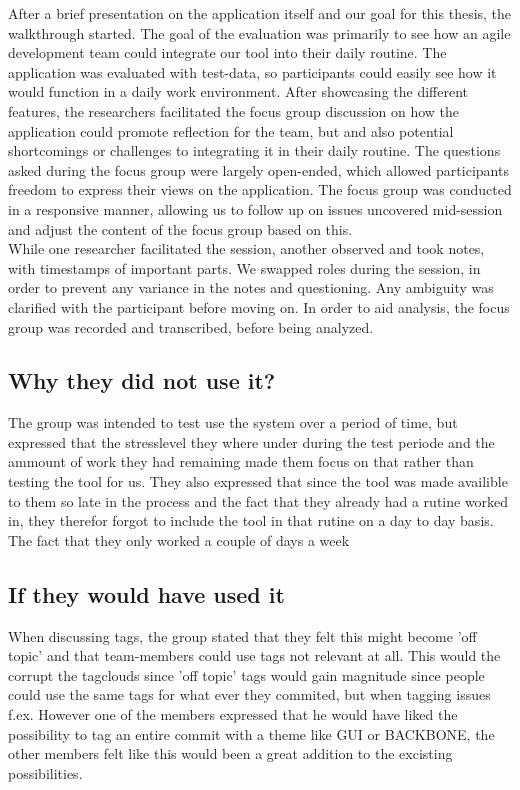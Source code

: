 After a brief presentation on the application itself and our goal for this thesis, the walkthrough started. The goal of the evaluation was primarily to see how an agile development team could integrate our tool into their daily routine. The application was evaluated with test-data, so participants could easily see how it would function in a daily work environment. After showcasing the different features, the researchers facilitated the focus group discussion on how the application could promote reflection for the team, but and also potential shortcomings or challenges to integrating it in their daily routine. The questions asked during the focus group were largely open-ended, which allowed participants freedom to express their views on the application\cite{yin2008case}. The focus group was conducted in a responsive manner, allowing us to follow up on issues uncovered mid-session and adjust the content of the focus group based on this\cite{rubin2011qualitative, wengraf2001qualitative}.\\
While one researcher facilitated the session, another observed and took notes, with timestamps of important parts. We swapped roles during the session, in order to prevent any variance in the notes and questioning. Any ambiguity was clarified with the participant before moving on. In order to aid analysis, the focus group was recorded and transcribed, before being analyzed. 

\subsection{Why they did not use it?}
The group was intended to test use the system over a period of time, but expressed that the stresslevel they where under during the test periode and the ammount of work they had remaining made them focus on that rather than testing the tool for us. They also expressed that since the tool was made availible to them so late in the process and the fact that they already had a rutine worked in, they therefor forgot to include the tool in that rutine on a day to day basis. The fact that they only worked a couple of days a week 

\subsection{If they would have used it}
When discussing tags, the group stated that they felt this might become 'off topic' and that team-members could use tags not relevant at all. This would the corrupt the tagclouds since 'off topic' tags would gain magnitude since people could use the same tags for what ever they commited, but when tagging issues f.ex. However one of the members expressed that he would have liked the possibility to tag an entire commit with a theme like GUI or BACKBONE, the other members felt like this would been a great addition to the excisting possibilities.

